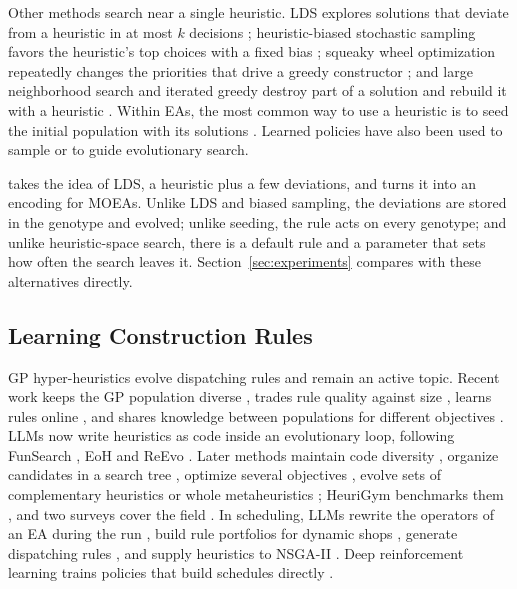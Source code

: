 Other methods search near a single heuristic.
LDS explores solutions that deviate from a heuristic in at most $k$ decisions \cite{harvey1995lds};
heuristic-biased stochastic sampling favors the heuristic's top choices with a fixed bias \cite{bresina1996hbss};
squeaky wheel optimization repeatedly changes the priorities that drive a greedy constructor \cite{joslin1999squeaky};
and large neighborhood search and iterated greedy destroy part of a solution and rebuild it with a heuristic \cite{shaw1998using,ruiz2007simple}.
Within EAs, the most common way to use a heuristic is to seed the initial population with its solutions \cite{shen2015dfjsp,zhang2011effective}.
Learned policies have also been used to sample \cite{gu2025synergizing} or to guide \cite{chen2026teacher} evolutionary search.

\RDD takes the idea of LDS, a heuristic plus a few deviations, and turns it into an encoding for MOEAs.
Unlike LDS and biased sampling, the deviations are stored in the genotype and evolved; unlike seeding, the rule acts on every genotype; and unlike heuristic-space search, there is a default rule and a parameter that sets how often the search leaves it.
Section~\ref{sec:experiments} compares \RDD with these alternatives directly.

\subsection{Learning Construction Rules}
\label{sec:related:rules}

GP hyper-heuristics evolve dispatching rules and remain an active topic.
Recent work keeps the GP population diverse \cite{zhang2026genetic}, trades rule quality against size \cite{pang2025multiform}, learns rules online \cite{nguyen2026towards}, and shares knowledge between populations for different objectives \cite{chen2025optimizing}.
LLMs now write heuristics as code inside an evolutionary loop, following FunSearch \cite{romera2024funsearch}, EoH \cite{liu2024evolution} and ReEvo \cite{ye2024reevo}.
Later methods maintain code diversity \cite{dat2025hsevo}, organize candidates in a search tree \cite{zheng2025monte}, optimize several objectives \cite{yao2025multi}, evolve sets of complementary heuristics \cite{liu2026eohs} or whole metaheuristics \cite{vanstein2025llamea}; HeuriGym benchmarks them \cite{chen2026heurigym}, and two surveys cover the field \cite{liu2026systematic,zhang2026systematic}.
In scheduling, LLMs rewrite the operators of an EA during the run \cite{liao2025online}, build rule portfolios for dynamic shops \cite{zhou2026dsevolve}, generate dispatching rules \cite{may2026llm,huang2025leveraging}, and supply heuristics to NSGA-II \cite{fornies2025remoh}.
Deep reinforcement learning trains policies that build schedules directly \cite{liu2025flexible}.

